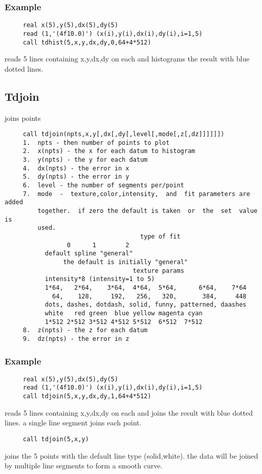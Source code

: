 \subsubsection{Example}
\begin{verbatim}
     real x(5),y(5),dx(5),dy(5) 
     read (1,'(4f10.0)') (x(i),y(i),dx(i),dy(i),i=1,5) 
     call tdhist(5,x,y,dx,dy,0,64+4*512) 
\end{verbatim}
reads  5  lines  containing x,y,dx,dy on each and histograms the result
with blue dotted lines.  
\subsection{Tdjoin}
joins points 
\begin{verbatim}
     call tdjoin(npts,x,y[,dx[,dy[,level[,mode[,z[,dz]]]]]]) 
     1.  npts - then number of points to plot 
     2.  x(npts) - the x for each datum to histogram 
     3.  y(npts) - the y for each datum 
     4.  dx(npts) - the error in x 
     5.  dy(npts) - the error in y 
     6.  level - the number of segments per/point 
     7.  mode  -  texture,color,intensity,  and  fit parameters are added
         together.  if zero the default is taken  or  the  set  value  is
         used.  
                                     type of fit
                 0      1        2 
           default spline "general" 
                the default is initially "general" 
                                   texture params
           intensity*8 (intensity=1 to 5) 
           1*64,   2*64,    3*64,  4*64,  5*64,      6*64,    7*64 
             64,    128,     192,   256,   320,       384,     448 
           dots, dashes, dotdash, solid, funny, patterned, daashes 
           white   red green  blue yellow magenta cyan 
           1*512 2*512 3*512 4*512 5*512  6*512  7*512 
     8.  z(npts) - the z for each datum 
     9.  dz(npts) - the error in z 
\end{verbatim}
\subsubsection{Example}
\begin{verbatim}
     real x(5),y(5),dx(5),dy(5) 
     read (1,'(4f10.0)') (x(i),y(i),dx(i),dy(i),i=1,5) 
     call tdjoin(5,x,y,dx,dy,1,64+4*512) 
\end{verbatim}
reads  5  lines  containing x,y,dx,dy on each and joins the result with
blue dotted lines.  a single line segment joins each point.  
\begin{verbatim}
     call tdjoin(5,x,y) 
\end{verbatim}
joins  the 5 points with the default line type (solid,white).  the data
will be joined by multiple line segments to form a smooth curve.  
